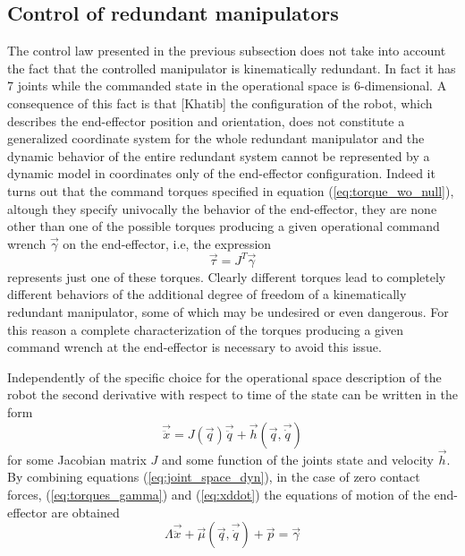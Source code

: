 \subsection{Control of redundant manipulators}
The control law presented in the previous subsection does not take into account
the fact that the controlled manipulator is kinematically redundant. In fact it has
7 joints while the commanded state in the operational space is 6-dimensional.
A consequence of this fact is that [Khatib] the configuration of the robot, which describes the
end-effector position and orientation, does not constitute a generalized coordinate
system for the whole redundant manipulator and the dynamic behavior of the entire redundant
system cannot be represented by a dynamic model in coordinates only of the end-effector
configuration. Indeed it turns out that the command torques specified in equation (\ref{eq:torque_wo_null}),
altough they specify univocally the behavior of the end-effector, they are none other than one of the
possible torques producing a given operational command wrench $\vec{\gamma}$ on the end-effector, i.e,
the expression
\begin{equation}\label{eq:torques_gamma}
  \vec{\tau} = J^{T} \vec{\gamma}
\end{equation}
represents just one of these torques. Clearly different torques lead to completely different behaviors
of the additional degree of freedom of a kinematically redundant manipulator, some of which may be undesired
or even dangerous. For this reason a complete characterization of the torques producing a given command wrench
at the end-effector is necessary to avoid this issue.
\par
Independently of the specific choice for the operational space description of the robot
the second derivative with respect to time of the state can be written in the form
\begin{equation}\label{eq:xddot}
  \vec{\ddot{x}} = J(\vec{q}) \vec{\ddot{q}} + \vec{h}(\vec{q},\vec{\dot{q}})
\end{equation}
for some Jacobian matrix $J$ and some function of the joints state and velocity $\vec{h}$.
By combining equations (\ref{eq:joint_space_dyn}), in the case of zero contact forces,
(\ref{eq:torques_gamma}) and (\ref{eq:xddot}) the equations of motion of the end-effector
are obtained
\begin{equation}\label{eq:operational_space_dyn}
  \Lambda \vec{\ddot{x}} + \vec{\mu}(\vec{q}, \vec{\dot{q}}) + \vec{p} = \vec{\gamma}
\end{equation}
